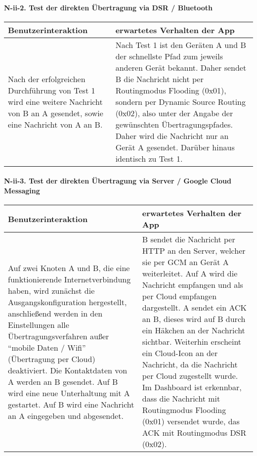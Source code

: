 \paragraph{N-ii-2. Test der direkten Übertragung via DSR /
Bluetooth}\label{test-der-direkten-uxfcbertragung-via-dsr-bluetooth}

\begin{longtable}{p{8cm}p{8.5cm}}
\toprule
Benutzerinteraktion & erwartetes Verhalten der App\tabularnewline
\midrule
\endhead
Nach der erfolgreichen Durchführung von Test 1 wird eine weitere
Nachricht von B an A gesendet, sowie eine Nachricht von A an B. & Nach
Test 1 ist den Geräten A und B der schnellste Pfad zum jeweils anderen
Gerät bekannt. Daher sendet B die Nachricht nicht per Routingmodus
Flooding (0x01), sondern per Dynamic Source Routing (0x02), also unter
der Angabe der gewünschten Übertragungspfades. Daher wird die Nachricht
nur an Gerät A gesendet. Darüber hinaus identisch zu Test
1.\tabularnewline
\bottomrule
\end{longtable}

\paragraph{N-ii-3. Test der direkten Übertragung via Server / Google Cloud
Messaging}\label{test-der-direkten-uxfcbertragung-via-server-google-cloud-messaging}

\begin{longtable}{p{8cm}p{8.5cm}}
\toprule
Benutzerinteraktion & erwartetes Verhalten der App\tabularnewline
\midrule
\endhead
Auf zwei Knoten A und B, die eine funktionierende Internetverbindung
haben, wird zunächst die Ausgangskonfiguration hergestellt, anschließend
werden in den Einstellungen alle Übertragungsverfahren außer ``mobile
Daten / Wifi'' (Übertragung per Cloud) deaktiviert. Die Kontaktdaten von
A werden an B gesendet. Auf B wird eine neue Unterhaltung mit A
gestartet. Auf B wird eine Nachricht an A eingegeben und abgesendet. & B
sendet die Nachricht per HTTP an den Server, welcher sie per GCM an
Gerät A weiterleitet. Auf A wird die Nachricht empfangen und als per
Cloud empfangen dargestellt. A sendet ein ACK an B, dieses wird auf B
durch ein Häkchen an der Nachricht sichtbar. Weiterhin erscheint ein
Cloud-Icon an der Nachricht, da die Nachricht per Cloud zugestellt
wurde. Im Dashboard ist erkennbar, dass die Nachricht mit Routingmodus
Flooding (0x01) versendet wurde, das ACK mit Routingmodus DSR
(0x02).\tabularnewline
\bottomrule
\end{longtable}
\clearpage

